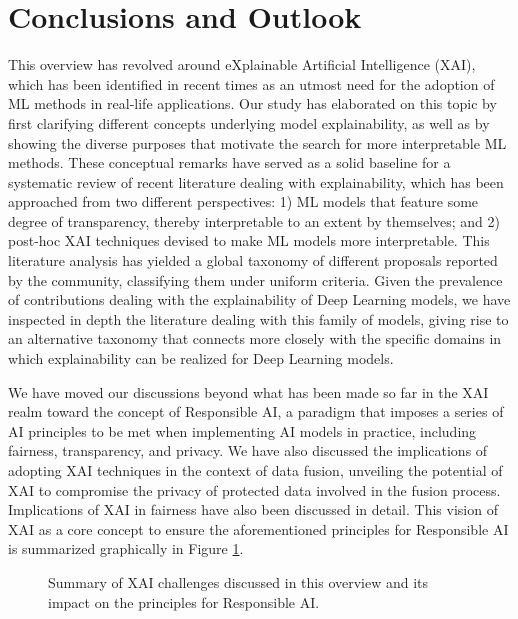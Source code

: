 \documentclass[final]{elsarticle}
\begin{document}
\section{Conclusions and Outlook} \label{sec:conc}

This overview has revolved around eXplainable Artificial Intelligence (XAI), which has been identified in recent times as an utmost need for the adoption of ML methods in real-life applications. Our study has elaborated on this topic by first clarifying different concepts underlying model explainability, as well as by showing the diverse purposes that motivate the search for more interpretable ML methods. These conceptual remarks have served as a solid baseline for a systematic review of recent literature dealing with explainability, which has been approached from two different perspectives: 1) ML models that feature some degree of transparency, thereby interpretable to an extent by themselves; and 2) post-hoc XAI techniques devised to make ML models more interpretable. This literature analysis has yielded a global taxonomy of different proposals reported by the community, classifying them under uniform criteria. Given the prevalence of contributions dealing with the explainability of Deep Learning models, we have inspected in depth the literature dealing with this family of models, giving rise to an alternative taxonomy that connects more closely with the specific domains in which explainability can be realized for Deep Learning models. 

We have moved our discussions beyond what has been made so far in the XAI realm toward the concept of Responsible AI, a paradigm that imposes a series of AI principles to be met when implementing AI models in practice, including fairness, transparency, and privacy. We have also discussed the implications of adopting XAI techniques in the context of data fusion, unveiling the potential of XAI to compromise the privacy of protected data involved in the fusion process. Implications of XAI in fairness have also been discussed in detail. {\color{black}This vision of XAI as a core concept to ensure the aforementioned principles for Responsible AI is summarized graphically in Figure \ref{fig:challenges_XAI_RAI}.}
\begin{figure}[ht]
	\caption{{\color{black}Summary of XAI challenges discussed in this overview and its impact on the principles for Responsible AI.}}
	\label{fig:challenges_XAI_RAI}
\end{figure}
\end{document}
